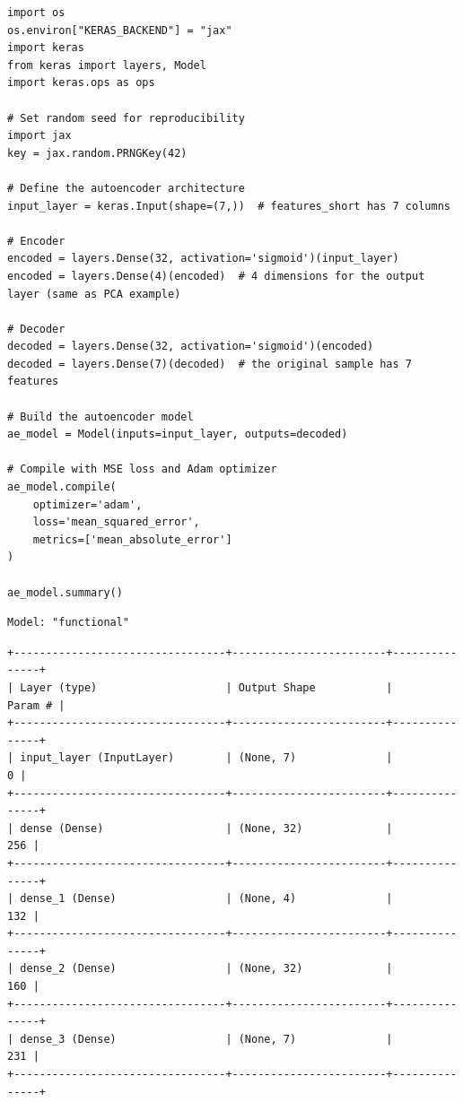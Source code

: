 \begin{verbatim}
import os                                                                                         
os.environ["KERAS_BACKEND"] = "jax"                                                                                                                                                                   
import keras                                                                                      
from keras import layers, Model 
import keras.ops as ops  

# Set random seed for reproducibility
import jax                                                                                        
key = jax.random.PRNGKey(42)   

# Define the autoencoder architecture
input_layer = keras.Input(shape=(7,))  # features_short has 7 columns

# Encoder
encoded = layers.Dense(32, activation='sigmoid')(input_layer)
encoded = layers.Dense(4)(encoded)  # 4 dimensions for the output layer (same as PCA example)

# Decoder
decoded = layers.Dense(32, activation='sigmoid')(encoded)
decoded = layers.Dense(7)(decoded)  # the original sample has 7 features

# Build the autoencoder model
ae_model = Model(inputs=input_layer, outputs=decoded)

# Compile with MSE loss and Adam optimizer
ae_model.compile(
    optimizer='adam',
    loss='mean_squared_error',
    metrics=['mean_absolute_error']
)

ae_model.summary()
\end{verbatim}

\begin{verbatim}
Model: "functional"
\end{verbatim}

\begin{verbatim}
+---------------------------------+------------------------+---------------+
| Layer (type)                    | Output Shape           |       Param # |
+---------------------------------+------------------------+---------------+
| input_layer (InputLayer)        | (None, 7)              |             0 |
+---------------------------------+------------------------+---------------+
| dense (Dense)                   | (None, 32)             |           256 |
+---------------------------------+------------------------+---------------+
| dense_1 (Dense)                 | (None, 4)              |           132 |
+---------------------------------+------------------------+---------------+
| dense_2 (Dense)                 | (None, 32)             |           160 |
+---------------------------------+------------------------+---------------+
| dense_3 (Dense)                 | (None, 7)              |           231 |
+---------------------------------+------------------------+---------------+
\end{verbatim}

